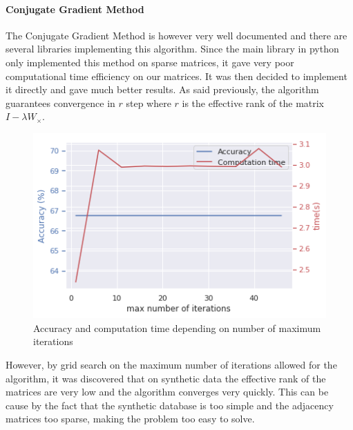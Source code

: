 \documentclass{article}
\theoremstyle{definition}
\begin{document}
\paragraph{Conjugate Gradient Method}
The Conjugate Gradient Method is however very well documented\cite{nesterov_lectures_2018} and there are several libraries implementing this algorithm. Since the main library in python\cite{jones2016scipy} only implemented this method on sparse matrices, it gave very poor computational time efficiency on our matrices. It was then decided to implement it directly and gave much better results. As said previously, the algorithm guarantees convergence in $r$ step where $r$ is the effective rank of the matrix $I-\lambda W_\times$. 
\begin{figure}[!htb]
	\centering
	\includegraphics[width=0.7\linewidth]{data/conj_grad/acc_time_fct_iter.png}
	\caption{Accuracy and computation time depending on number of maximum iterations}
\end{figure}
However, by grid search on the maximum number of iterations allowed for the algorithm, it was discovered that on synthetic data the effective rank of the matrices are very low and the algorithm converges very quickly. This can be cause by the fact that the synthetic database is too simple and the adjacency matrices too sparse, making the problem too easy to solve.
\end{document}
